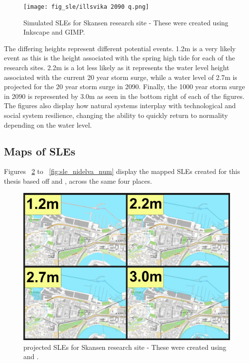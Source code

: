 \begin{figure}[H]
    \centering
    \texttt{[image: fig\_sle/illsvika 2090 q.png]}
    \caption{Simulated SLEs for Skansen research site - These were created using Inkscape and GIMP. }
    \label{fig:sle-skansen}
\end{figure}


The differing heights represent different potential events. 1.2m is a very likely event as this is the height associated with the spring high tide for each of the research sites. 2.2m is a lot less likely as it represents the water level height associated with the current 20 year storm surge, while a water level of 2.7m is projected for the 20 year storm surge in 2090. Finally, the 1000 year storm surge in 2090 is represented by 3.0m as seen in the bottom right of each of the figures. The figures also display how natural systems interplay with technological and social system resilience, changing the ability to quickly return to normality depending on the water level. 

\subsection{Maps of SLEs}
Figures ~\ref{fig:sle_skansen_num} to ~\ref{fig:sle_nidelva_num}  display the mapped SLEs created for this thesis based off \cite{kartverket_se_2020} and \cite{stormflo_database_stormflo_2021}, across the same four places.

\begin{figure}[H]
    \centering
    \includegraphics[width=16cm]{fig_sle/skansen-sle-num.png}
    \caption{projected SLEs for Skansen research site - These were created using \cite{kartverket_se_2021} and \cite{stormflo_database_stormflo_2021}. }
    \label{fig:sle_skansen_num}
\end{figure}

